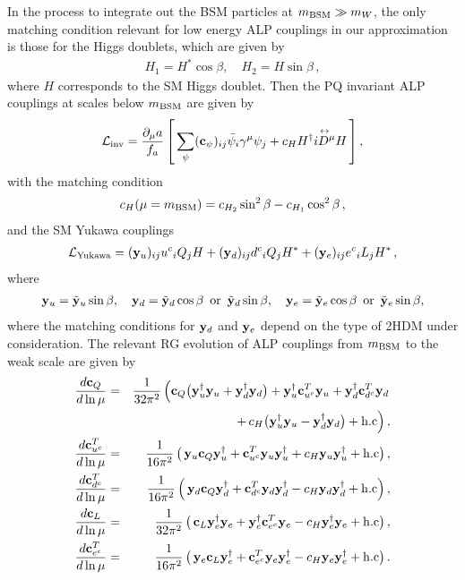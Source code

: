\documentclass[preprint,prd,aps,tighten,nofootinbib,amssymb]{revtex4}
\newcommand{\bea}{\begin{eqnarray}}
\newcommand{\eea}{\end{eqnarray}}
\newcommand{\dis}[1]{\begin{equation}\begin{split}#1\end{split}\end{equation}}
\def\vpq{f_{a}}
\newcommand{\C}{\bold c}
\newcommand{\Y}{\tilde{\bold  y}}
\newcommand{\y}{\bold y}
\begin{document}
In the process to integrate out the BSM particles at $m_{\rm BSM}\gg m_W$, the only matching condition relevant for low energy ALP couplings in our approximation is those for the Higgs doublets, which are given by 
\bea
H_1= H^*\cos\beta, \quad H_2=H\sin\beta \, ,
\label{matching_cond}
\eea
where $H$ corresponds to the SM Higgs doublet.
Then the PQ invariant ALP couplings at scales below $m_{\rm BSM}$ are given by
\dis{
\label{coup}
{\cal L}_{\rm inv}=\frac{\partial_\mu a}{\vpq}\left[\,\sum_{\psi} (\C_\psi)_{ij} \bar\psi_i \gamma^\mu \psi_j
+ c_{H}H^\dagger\overset{\leftrightarrow}{i D^\mu} H\,\right],
}
with the matching condition
\bea \label{cH_BSM}
c_H(\mu=m_{\rm BSM})=c_{H_2}\sin^2\beta - c_{H_1}\cos^2\beta \, ,
\eea
and the SM Yukawa couplings
\dis{
\label{yukawa_sm}
{\cal L}_{\rm Yukawa}=(\y_u)_{ij} {u^c}_{i}  Q_{j} H + (\y_d)_{ij}  {d^c}_{i} Q_{j} H^* + (\y_e)_{ij} {e^c}_{i}  L_j H^*\, ,
}
where
\bea
\y_u = \Y_u\sin\beta, \quad \y_d =\Y_d
\cos \beta~\, \textrm{or}\, ~\Y_d\sin\beta, \quad \y_e =\Y_e\cos\beta \, ~\textrm{or}\,~ \Y_e\sin \beta,
\eea
where the matching conditions for $\y_d$ and $\y_e$ depend on the type of 2HDM under  consideration. 
The relevant RG evolution of ALP couplings from $m_{\rm BSM}$ to the weak scale are given by
\bea
\frac{d\C_Q}{d\ln \mu} & = & \frac{1}{32 \pi^2}\left(\C_Q \big(\y_u^\dagger  \y_u + \y_d^\dagger \y_d\big)
 + \y_u^\dagger \C_{u^c}^T   \y_u + \y_d^\dagger \C_{d^c}^T \y_d \right.\nonumber \\
 &&\left. \quad \quad \quad  +\, c_{H}\big(\y_u^\dagger \y_u -\y_d^\dagger \y_d\big) 
 +{\rm h.c}\right),  \nonumber \\
\frac{d\C_{u^c}^T}{d\ln \mu} & = & \frac{1}{16\pi^2}\left(  \, \y_{u} \C_Q \y_{u}^\dagger +  \C_{u^c}^T \y_{u} \y_{u}^\dagger + c_{H}\y_u \y_u^\dagger + {\rm h.c}  \right),  \nonumber \\
\frac{d\C_{d^c}^T}{d\ln \mu} & = & \frac{1}{16\pi^2}\left(  \, \y_{d} \C_Q \y_{d}^\dagger +  \C_{d^c}^T \y_{d} \y_{d}^\dagger -c_{H}\y_d \y_d^\dagger + {\rm h.c}  \right), \nonumber  \\
\frac{d\C_L}{d\ln \mu} & = & \frac{1}{32\pi^2}\left( \, \C_L \y_e^\dagger \y_e +\y_e^\dagger \C_{e^c}^T \y_e  -c_{H}\y_e^\dagger \y_e+{\rm h.c} \right), \nonumber  \\
\frac{d\C_{e^c}^T}{d\ln \mu} & = & \frac{1}{16\pi^2}\left(\, \y_{e} \C_L \y_{e}^\dagger +  \C_{e^c}^T \y_{e} \y_{e}^\dagger -
c_{H}\y_e \y_e^\dagger +{\rm h.c} \right). \label{RG_SM}
\eea
\end{document}
